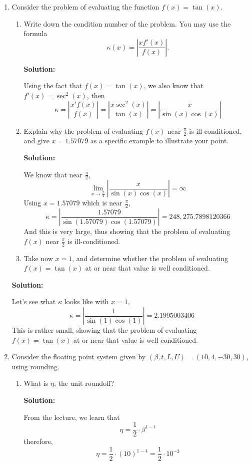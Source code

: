 \documentclass[11pt]{article}
\newenvironment{solution}
  {\par\noindent\textbf{Solution:}\par}
  {\par}
\begin{document}
\begin{enumerate}
\begin{enumerate}
\end{enumerate}

\item
Consider the problem of evaluating the function $f(x)=\tan(x)$.
\begin{enumerate} 
\item Write down the condition number of the problem. You may use the formula  $$\kappa(x) = \left| \frac{x f'(x)}{f(x)} \right|. $$
  \begin{solution}
    Using the fact that $f(x)=\tan(x)$, we also know that $f'(x) = \sec^2(x)$, then 
    $$\kappa = \left| \frac{x'f(x)}{f(x)} \right| = \left| \frac{x\sec^2(x)}{\tan(x)} \right| = \left| \frac{x}{\sin(x)\cos(x)} \right|$$
  \end{solution}

\item 
Explain why the problem of evaluating $f(x)$ near $\frac{\pi}{2}$ is ill-conditioned, and give 
$x=1.57079$ as a specific example to illustrate your point.
\begin{solution}
  We know that near $\frac{\pi}{2}$,
  $$\lim_{x \to \frac{\pi}{2}}\left| \frac{x}{\sin(x)\cos(x)} \right| = \infty$$
  Using $x=1.57079$ which is near $\frac{\pi}{2}$,
  $$\kappa = \left| \frac{1.57079}{\sin(1.57079)\cos(1.57079)}\right| = 248,275.7898120366$$
  And this is very large, thus showing that the problem of evaluating $f(x)$ near $\frac{\pi}{2}$ is ill-conditioned.
\end{solution}


\item Take now $x=1$, and determine whether the problem of evaluating $f(x)=\tan(x)$ at or near that value is well conditioned.
\end{enumerate}

\begin{solution}
  Let's see what $\kappa$ looks like with $x=1$,
  $$\kappa = \left| \frac{1}{\sin(1)\cos(1)} \right| = 2.1995003406$$
  This is rather small, showing that the problem of evaluating $f(x)=\tan(x)$ at or near that value is well conditioned.
\end{solution}

\item  
Consider the floating point system given by $(\beta,t,L,U)=(10,4,-30,30)$, using rounding. 
\begin{enumerate}
\item What is $\eta$, the unit roundoff?
  \begin{solution}
    From the lecture, we learn that
    $$\eta = \frac{1}{2} \cdot \beta^{1 - t}$$
    therefore, $$\eta = \frac{1}{2} \cdot (10)^{1 - 4} = \frac{1}{2} \cdot 10^{-3} $$
  \end{solution}
  

\end{enumerate}
\end{enumerate}
\end{document}
